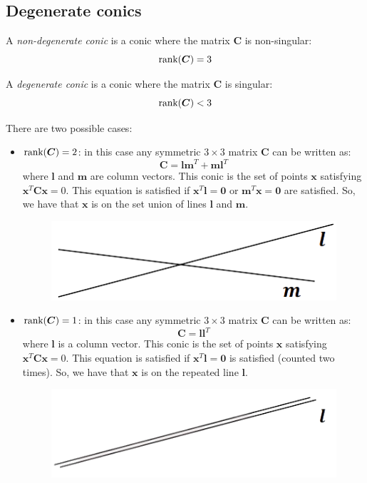 \documentclass[12pt, a4paper]{report}
\newtheorem[style=M,bodystyle=\normalfont]{theorem}{Theorem}
\newtheorem[style=M,bodystyle=\normalfont]{corollary}{Corollary}
\newtheorem[style=M,bodystyle=\normalfont]{lemma}{Lemma}
\newtheorem[style=M,bodystyle=\normalfont]{definition}{Definition}
\begin{document}
    \subsection{Degenerate conics}
    \begin{definition}
        A \emph{non-degenerate conic} is a conic where the matrix $\boldsymbol{C}$ is non-singular: 
        \[\textnormal{rank}(\boldsymbol{C})=3\]

        A \emph{degenerate conic} is a conic where the matrix $\boldsymbol{C}$ is singular: 
        \[\textnormal{rank}(\boldsymbol{C}) < 3\]
    \end{definition}
    There are two possible cases: 
    \begin{itemize}
        \item $\textnormal{rank}(\boldsymbol{C}) = 2$: in this case any symmetric $3 \times 3$ matrix $\boldsymbol{C}$ can be written as:
            \[\boldsymbol{C}=\boldsymbol{lm}^T+\boldsymbol{ml}^T\]
            where $\boldsymbol{l}$ and $\boldsymbol{m}$ are column vectors. This conic is the set of points $\boldsymbol{x}$ satisfying $\boldsymbol{x}^T\boldsymbol{C}\boldsymbol{x}=0$. This equation is 
            satisfied if $\boldsymbol{x}^T\boldsymbol{l}=\boldsymbol{0}$ or $\boldsymbol{m}^T\boldsymbol{x}=\boldsymbol{0}$ are satisfied. So, we have that $\boldsymbol{x}$ is on the set union of lines 
            $\boldsymbol{l}$ and $\boldsymbol{m}$.
            \begin{figure}[H]
                \centering
                \includegraphics[width=0.5\linewidth]{images/inters.png}
            \end{figure}
        \item $\textnormal{rank}(\boldsymbol{C}) = 1$: in this case any symmetric $3 \times 3$ matrix $\boldsymbol{C}$ can be written as:
            \[\boldsymbol{C}=\boldsymbol{ll}^T\]
            where $\boldsymbol{l}$ is a column vector. This conic is the set of points $\boldsymbol{x}$ satisfying $\boldsymbol{x}^T\boldsymbol{C}\boldsymbol{x}=0$. This equation is 
            satisfied if $\boldsymbol{x}^T\boldsymbol{l}=\boldsymbol{0}$ is satisfied (counted two times). So, we have that $\boldsymbol{x}$ is on the repeated line $\boldsymbol{l}$. 
            \begin{figure}[H]
                \centering
                \includegraphics[width=0.5\linewidth]{images/rep.png}
            \end{figure}
    \end{itemize}
\end{document}
